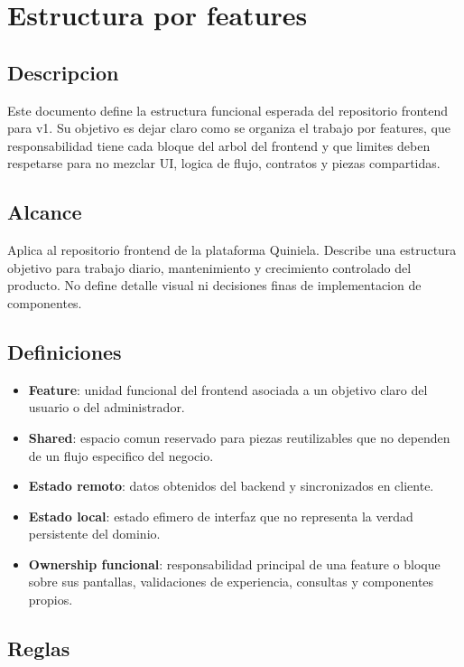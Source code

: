 \section{Estructura por features}

\subsection{Descripcion}

Este documento define la estructura funcional esperada del repositorio frontend para v1. Su objetivo es dejar claro como se organiza el trabajo por features, que responsabilidad tiene cada bloque del arbol del frontend y que limites deben respetarse para no mezclar UI, logica de flujo, contratos y piezas compartidas.

\subsection{Alcance}

Aplica al repositorio frontend de la plataforma Quiniela. Describe una estructura objetivo para trabajo diario, mantenimiento y crecimiento controlado del producto. No define detalle visual ni decisiones finas de implementacion de componentes.

\subsection{Definiciones}

\begin{itemize}
  \item \textbf{Feature}: unidad funcional del frontend asociada a un objetivo claro del usuario o del administrador.
  \item \textbf{Shared}: espacio comun reservado para piezas reutilizables que no dependen de un flujo especifico del negocio.
  \item \textbf{Estado remoto}: datos obtenidos del backend y sincronizados en cliente.
  \item \textbf{Estado local}: estado efimero de interfaz que no representa la verdad persistente del dominio.
  \item \textbf{Ownership funcional}: responsabilidad principal de una feature o bloque sobre sus pantallas, validaciones de experiencia, consultas y componentes propios.
\end{itemize}

\subsection{Reglas}

